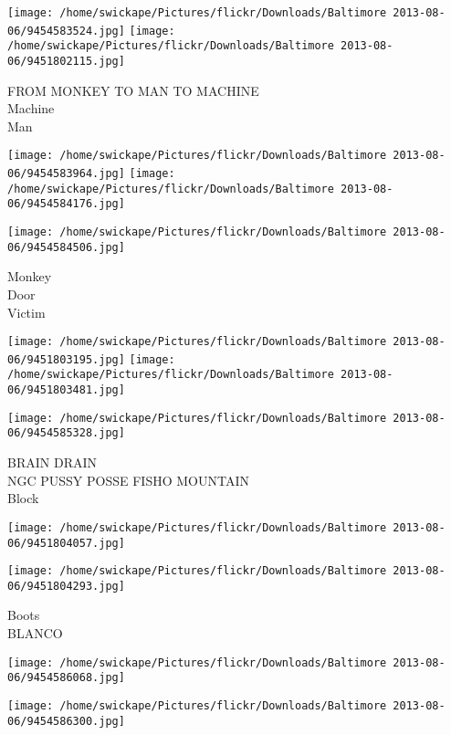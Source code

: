 \documentclass[10pt,letterpaper]{article}
\begin{document}
\vspace{0.25in}
\texttt{[image: /home/swickape/Pictures/flickr/Downloads/Baltimore 2013-08-06/9454583524.jpg]}
\texttt{[image: /home/swickape/Pictures/flickr/Downloads/Baltimore 2013-08-06/9451802115.jpg]}

FROM MONKEY TO MAN TO MACHINE\\
Machine\\
Man
\pagebreak

\texttt{[image: /home/swickape/Pictures/flickr/Downloads/Baltimore 2013-08-06/9454583964.jpg]}
\texttt{[image: /home/swickape/Pictures/flickr/Downloads/Baltimore 2013-08-06/9454584176.jpg]}

\vspace{0.25in}
\texttt{[image: /home/swickape/Pictures/flickr/Downloads/Baltimore 2013-08-06/9454584506.jpg]}

Monkey\\
Door\\
Victim
\pagebreak

\texttt{[image: /home/swickape/Pictures/flickr/Downloads/Baltimore 2013-08-06/9451803195.jpg]}
\texttt{[image: /home/swickape/Pictures/flickr/Downloads/Baltimore 2013-08-06/9451803481.jpg]}

\vspace{0.25in}
\texttt{[image: /home/swickape/Pictures/flickr/Downloads/Baltimore 2013-08-06/9454585328.jpg]}

BRAIN DRAIN\\
NGC PUSSY POSSE FISHO MOUNTAIN\\
Block
\pagebreak

\texttt{[image: /home/swickape/Pictures/flickr/Downloads/Baltimore 2013-08-06/9451804057.jpg]}

\vspace{0.25in}
\texttt{[image: /home/swickape/Pictures/flickr/Downloads/Baltimore 2013-08-06/9451804293.jpg]}

Boots\\
BLANCO
\pagebreak

\texttt{[image: /home/swickape/Pictures/flickr/Downloads/Baltimore 2013-08-06/9454586068.jpg]}

\vspace{0.25in}
\texttt{[image: /home/swickape/Pictures/flickr/Downloads/Baltimore 2013-08-06/9454586300.jpg]}
\end{document}
